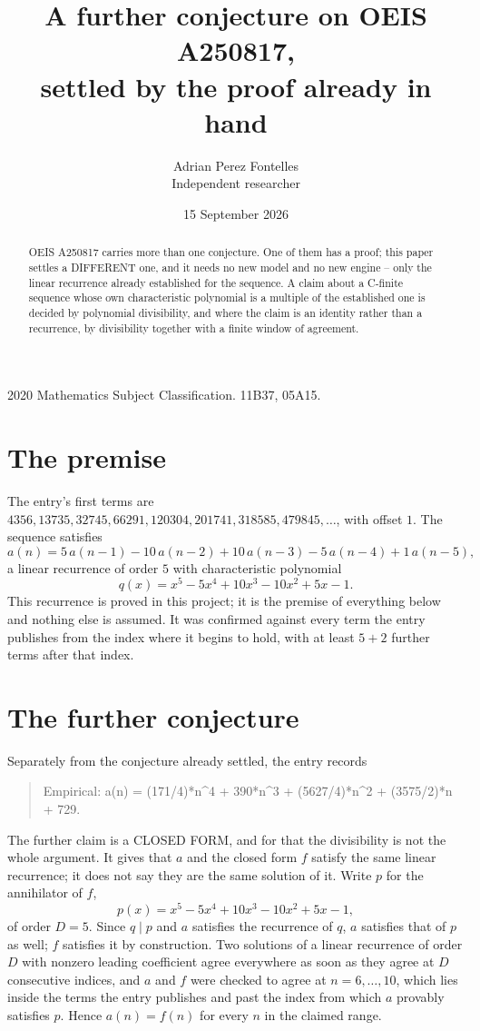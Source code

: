 \documentclass[11pt,a4paper]{article}
\title{A further conjecture on OEIS A250817,\\ \large settled by the proof already in hand}
\author{Adrian Perez Fontelles\\ \small Independent researcher}
\date{15 September 2026}
\theoremstyle{plain}
\theoremstyle{definition}
\begin{document}
\maketitle

\begin{abstract}
OEIS A250817 carries more than one conjecture. One of them has a proof; this paper settles a
DIFFERENT one, and it needs no new model and no new engine -- only the linear recurrence already
established for the sequence. A claim about a C-finite sequence whose own characteristic
polynomial is a multiple of the established one is decided by polynomial divisibility, and where
the claim is an identity rather than a recurrence, by divisibility together with a finite window
of agreement.
\end{abstract}

\noindent\small 2020 Mathematics Subject Classification. 11B37, 05A15.\normalsize

\section{The premise}

The entry's first terms are $4356, 13735, 32745, 66291, 120304, 201741, 318585, 479845,\dots$, with offset $1$. The sequence satisfies
\[
  a(n)=5\,a(n-1) - 10\,a(n-2) + 10\,a(n-3) - 5\,a(n-4) + 1\,a(n-5) ,
\]
a linear recurrence of order $5$ with characteristic polynomial
\[
  q(x)=x^{5} - 5 x^{4} + 10 x^{3} - 10 x^{2} + 5 x - 1 .
\]
This recurrence is proved in this project; it is the premise of everything below and nothing else is assumed.
It was confirmed against every term the entry publishes from the index where it begins to hold,
with at least $5+2$ further terms after that index.

\section{The further conjecture}

Separately from the conjecture already settled, the entry records

\begin{quote}\raggedright Empirical: a(n) = (171/4)*n\^{}4 + 390*n\^{}3 + (5627/4)*n\^{}2 + (3575/2)*n + 729.\end{quote}

The further claim is a CLOSED FORM, and for that the divisibility is not the whole argument. It
gives that $a$ and the closed form $f$ satisfy the same linear recurrence; it does not say they
are the same solution of it. Write $p$ for the annihilator of $f$,
\[
  p(x)=x^{5} - 5 x^{4} + 10 x^{3} - 10 x^{2} + 5 x - 1 ,
\]
of order $D=5$. Since $q\mid p$ and $a$ satisfies the recurrence of $q$, $a$ satisfies that of
$p$ as well; $f$ satisfies it by construction. Two solutions of a linear recurrence of order $D$
with nonzero leading coefficient agree everywhere as soon as they agree at $D$ consecutive
indices, and $a$ and $f$ were checked to agree at $n=6,\dots,10$,
which lies inside the terms the entry publishes and past the index from which $a$ provably
satisfies $p$. Hence $a(n)=f(n)$ for every $n$ in the claimed range.
\end{document}
